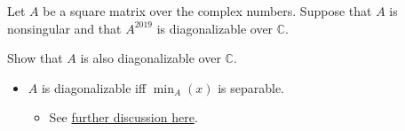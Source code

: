 Let \(A\) be a square matrix over the complex numbers. Suppose that
\(A\) is nonsingular and that \(A^{2019}\) is diagonalizable over
\({\mathbb{C}}\).

Show that \(A\) is also diagonalizable over \({\mathbb{C}}\).

\begin{concept}

\envlist

\begin{itemize}
\tightlist
\item
  \(A\) is diagonalizable iff \(\min_A(x)\) is separable.

  \begin{itemize}
  \tightlist
  \item
    See
    \href{https://math.stackexchange.com/questions/3027664/if-a-is-invertible-and-an-is-diagonalizable-then-a-is-diagonalizable}{further
    discussion here}.
  \end{itemize}
\end{itemize}

\end{concept}


